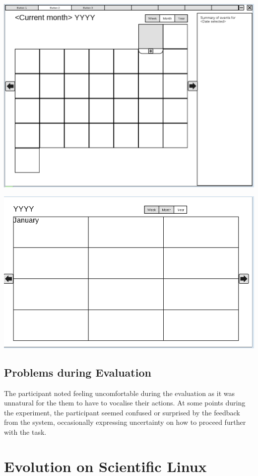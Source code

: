 \documentclass{article}
\begin{document}
\includegraphics[scale=0.5,angle=90]{CMCLGDRMonth.png}

\includegraphics[scale=0.5,angle=90]{CMCLGDRYear.png}

\subsection{Problems during Evaluation}

The participant noted feeling uncomfortable during the evaluation as it
was unnatural for the them to have to vocalise their actions. At some
points during the experiment, the participant seemed confused or
surprised by the feedback from the system, occasionally expressing
uncertainty on how to proceed further with the task.

\section{Evolution on Scientific Linux}
\end{document}
